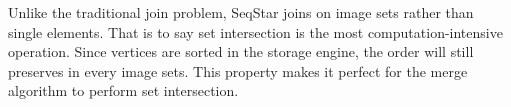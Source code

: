Unlike the traditional join problem, SeqStar joins on image sets rather than single elements.
That is to say set intersection is the most computation-intensive operation.
Since vertices are sorted in the storage engine,
the order will still preserves in every image sets.
This property makes it perfect for the merge algorithm to perform set intersection.

